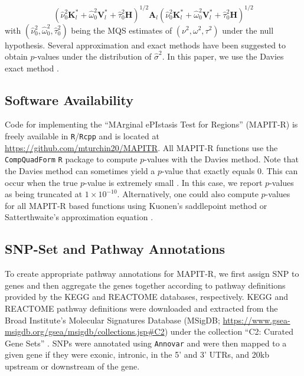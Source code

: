 \documentclass[10pt]{article}
\newcommand{\bK}{\mathbf{K}}
\newcommand{\bV}{\mathbf{V}}
\newcommand{\bA}{\mathbf{A}}
\newcommand{\bH}{\mathbf{H}}
\newcommand{\wh}{\widehat}
\begin{document}
\begin{equation*}
\left(\wh\nu^2_{0}\bK^*_l+\wh\omega^2_{0}\bV^*_l+\wh\tau^2_{0}\bH\right)^{1/2}\bA_{l}\left(\wh\nu^2_{0}\bK^*_l+\wh\omega^2_{0}\bV^*_l+\wh\tau^2_{0}\bH\right)^{1/2} 
\end{equation*}
with $(\wh\nu^2_{0},\wh\omega^2_{0},\wh\tau^2_{0})$ being the MQS estimates of $(\nu^2,\omega^2,\tau^2)$ under the null hypothesis. Several approximation and exact methods have been suggested to obtain $p$-values under the distribution of $\wh\sigma^2$. In this paper, we use the Davies exact method \cite{Davies1980,Wu2011}. 

\subsection*{Software Availability}

Code for implementing the ``MArginal ePIstasis Test for Regions'' (MAPIT-R) is freely available in \texttt{R}/\texttt{Rcpp} and is located at \url{https://github.com/mturchin20/MAPITR}. All MAPIT-R functions use the \texttt{CompQuadForm} \texttt{R} package to compute $p$-values with the Davies method. Note that the Davies method can sometimes yield a $p$-value that exactly equals 0. This can occur when the true $p$-value is extremely small \cite{Chen2013}. In this case, we report $p$-values as being truncated at $1\times10^{-10}$. Alternatively, one could also compute $p$-values for all MAPIT-R based functions using Kuonen's saddlepoint method \cite{Chen2013,Kuonen1999} or Satterthwaite's approximation equation \cite{Satterthwaite1946}.

\subsection*{SNP-Set and Pathway Annotations}

To create appropriate pathway annotations for MAPIT-R, we first assign SNP to genes and then aggregate the genes together according to pathway definitions provided by the KEGG and REACTOME databases, respectively. KEGG and REACTOME pathway definitions were downloaded and extracted from the Broad Institute's Molecular Signatures Database (MSigDB; \url{https://www.gsea-msigdb.org/gsea/msigdb/collections.jsp#C2}) under the collection ``C2: Curated Gene Sets'' \cite{Liberzon2011}. SNPs were annotated using \texttt{Annovar} \cite{Wang2010a} and were then mapped to a given gene if they were exonic, intronic, in the 5' and 3' UTRs, and 20kb upstream or downstream of the gene.
\end{document}
